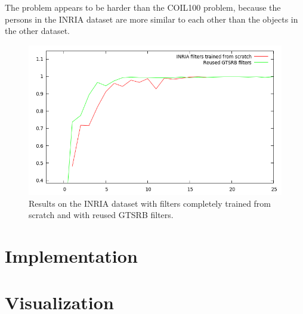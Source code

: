 \documentclass[11pt, a4paper]{article}
\begin{document}
The problem appears to be harder than the COIL100 problem, because the persons in the INRIA dataset are more similar to each other than the objects in the other dataset.

\begin{figure}[h!]
	\centering
	\includegraphics[width=1\textwidth]{inria_results.png}
	\caption{Results on the INRIA dataset with filters completely trained from scratch and with reused GTSRB filters.}
	\label{fig:inria_results}
\end{figure}

\begin{appendix}
	\section{Implementation}
	\section{Visualization}
\end{appendix}

{}

\end{document}
